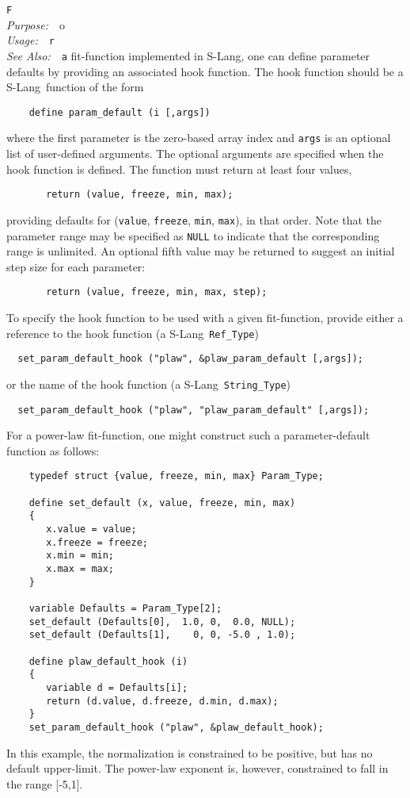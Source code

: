 \documentclass{book}
\makeatletter
\newif\ifpdf
\newcommand{\slang}{{\sc S-Lang}}
\newenvironment{isisfunction}[4]%
{\index{{#1}@{\tt #1}}%
  \ifpdf
  \else
     \addcontentsline{toc}{subsection}{{#1} -- {#2}}
  \fi
  \vbox{
          \vspace*{\baselineskip}
          {\LARGE\tt #1}\vspace*{\baselineskip}\\
          {{\it Purpose:}~~{#2}}\\
          {{\it Usage:}~~{\tt #3}}\\
          {{\it See Also:}~~{\tt #4}}
       }
}%
{ }
\makeatother
\begin{document}
{\begin{isisfunction}
For a fit-function implemented in \slang, one can define
parameter defaults by providing an associated hook function.
The hook function should be a \slang\ function of the form
\begin{verbatim}
    define param_default (i [,args])
\end{verbatim}
where the first parameter is the zero-based array index and
\verb|args| is an optional list of user-defined arguments. The
optional arguments are specified when the hook function is
defined. The function must return at least four values,
\begin{verbatim}
       return (value, freeze, min, max);
\end{verbatim}
providing defaults for (\verb|value|, \verb|freeze|,
\verb|min|, \verb|max|), in that order. Note that the parameter
range may be specified as \verb|NULL| to indicate that the
corresponding range is unlimited.  An optional fifth value
may be returned to suggest an initial step size for each
parameter:
\begin{verbatim}
       return (value, freeze, min, max, step);
\end{verbatim}

To specify the hook function to be used with a given fit-function,
provide either a reference to the hook function (a \slang\
\verb|Ref_Type|)
\begin{verbatim}
  set_param_default_hook ("plaw", &plaw_param_default [,args]);
\end{verbatim}
or the name of the hook function (a \slang\ \verb|String_Type|)
\begin{verbatim}
  set_param_default_hook ("plaw", "plaw_param_default" [,args]);
\end{verbatim}

For a power-law fit-function, one might construct such a
parameter-default function as follows:
\begin{verbatim}
    typedef struct {value, freeze, min, max} Param_Type;

    define set_default (x, value, freeze, min, max)
    {
       x.value = value;
       x.freeze = freeze;
       x.min = min;
       x.max = max;
    }

    variable Defaults = Param_Type[2];
    set_default (Defaults[0],  1.0, 0,  0.0, NULL);
    set_default (Defaults[1],    0, 0, -5.0 , 1.0);

    define plaw_default_hook (i)
    {
       variable d = Defaults[i];
       return (d.value, d.freeze, d.min, d.max);
    }
    set_param_default_hook ("plaw", &plaw_default_hook);
\end{verbatim}
In this example, the normalization is constrained to be
positive, but has no default upper-limit.  The power-law
exponent is, however, constrained to fall in the range [-5,1].


\end{isisfunction}}
\end{document}
